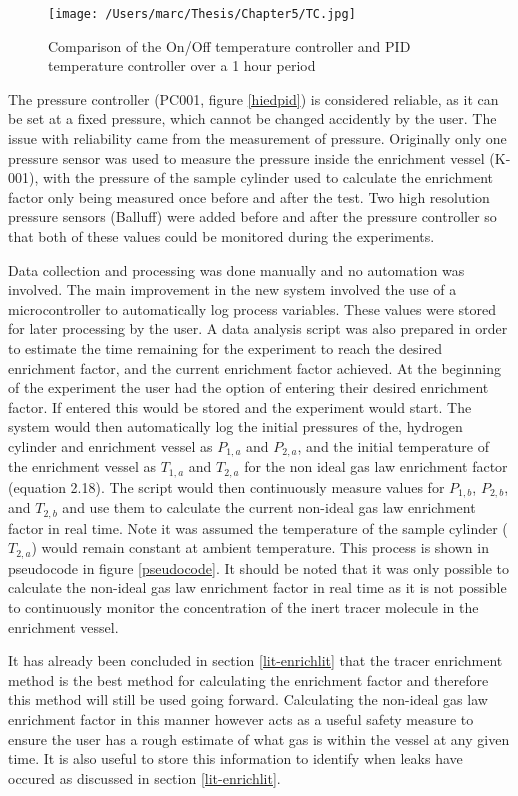 \begin{figure}
    \centering
    \texttt{[image: /Users/marc/Thesis/Chapter5/TC.jpg]}
    \caption{Comparison of the On/Off temperature controller and PID temperature controller over a 1 hour period}
    \label{TCcompare}
\end{figure}

The pressure controller (PC001, figure \ref{hiedpid}) is considered reliable, as it can be set at a fixed pressure, which cannot be changed accidently by the user. The issue with reliability came from the measurement of pressure. Originally only one pressure sensor was used to measure the pressure inside the enrichment vessel (K-001), with the pressure of the sample cylinder used to calculate the enrichment factor only being measured once before and after the test. Two high resolution pressure sensors (Balluff) were added before and after the pressure controller so that both of these values could be monitored during the experiments. 

Data collection and processing was done manually and no automation was involved. The main improvement in the new system involved the use of a microcontroller to automatically log process variables. These values were stored for later processing by the user. A data analysis script was also prepared in order to estimate the time remaining for the experiment to reach the desired enrichment factor, and the current enrichment factor achieved. At the beginning of the experiment the user had the option of entering their desired enrichment factor. If entered this would be stored and the experiment would start. The system would then automatically log the initial pressures of the, hydrogen cylinder and enrichment vessel as $P_{1,a}$ and $P_{2,a}$, and the initial temperature of the enrichment vessel as $T_{1,a}$ and $T_{2,a}$ for the non ideal gas law enrichment factor (equation 2.18). The script would then continuously measure values for $P_{1,b}$, $P_{2,b}$, and $T_{2, b}$ and use them to calculate the current non-ideal gas law enrichment factor in real time. Note it was assumed the temperature of the sample cylinder ($T_{2,a}$) would remain constant at ambient temperature. This process is shown in pseudocode in figure \ref{pseudocode}. It should be noted that it was only possible to calculate the non-ideal gas law enrichment factor in real time as it is not possible to continuously monitor the concentration of the inert tracer molecule in the enrichment vessel. 

It has already been concluded in section \ref{lit-enrichlit} that the tracer enrichment method is the best method for calculating the enrichment factor and therefore this method will still be used going forward. Calculating the non-ideal gas law enrichment factor in this manner however acts as a useful safety measure to ensure the user has a rough estimate of what gas is within the vessel at any given time. It is also useful to store this information to identify when leaks have occured as discussed in section \ref{lit-enrichlit}.


